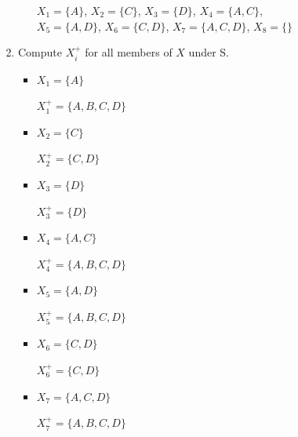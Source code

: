 \documentclass[12pt]{article}
\begin{document}
\begin{enumerate}[1.]
\begin{enumerate}[a)]
\begin{itemize}
\begin{itemize}
\begin{enumerate}[1.]
\begin{itemize}
                        \bigskip

                        $X_1 = \{A\}$, $X_2 = \{C\}$, $X_3 = \{D\}$, $X_4 = \{A,C\}$,
                        $X_5 = \{A,D\}$, $X_6 = \{C,D\}$, $X_7 = \{A,C,D\}$, $X_8 = \{\}$

                    \end{itemize}
                    \color{black}
                    \item Compute $X_i^+$ for all members of $X$ under S.

                    \color{red}
                    \begin{itemize}
                        \item $X_1 = \{A\}$

                        \bigskip

                        $X_1^+ = \{A,B,C,D\}$

                        \item $X_2 = \{C\}$

                        \bigskip

                        $X_2^+ = \{C,D\}$

                        \item $X_3 = \{D\}$

                        \bigskip

                        $X_3^+ = \{D\}$

                        \item $X_4 = \{A,C\}$

                        \bigskip

                        $X_4^+ = \{A,B,C,D\}$

                        \item $X_5 = \{A,D\}$

                        \bigskip

                        $X_5^+ = \{A,B,C,D\}$

                        \item $X_6 = \{C,D\}$

                        \bigskip

                        $X_6^+ = \{C,D\}$

                        \item $X_7 = \{A,C,D\}$

                        \bigskip

                        $X_7^+ = \{A,B,C,D\}$



\end{itemize}
\end{enumerate}
\end{itemize}
\end{itemize}
\end{enumerate}
\end{enumerate}
\end{document}
